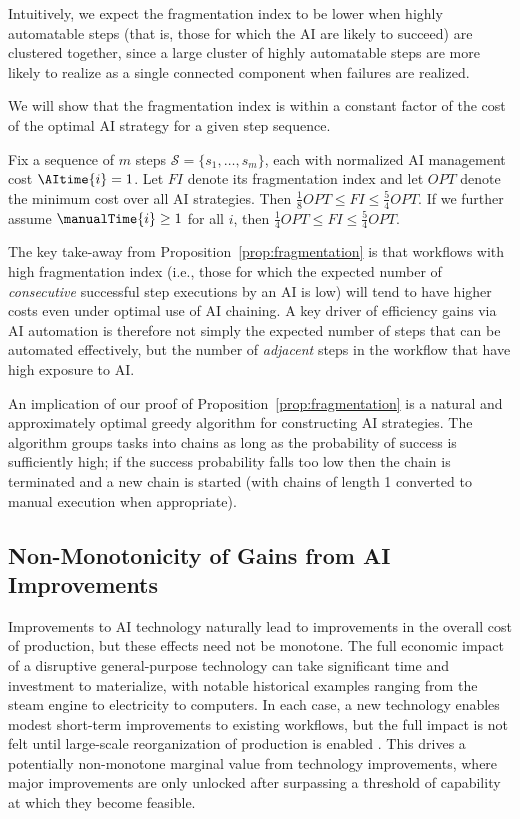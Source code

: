 Intuitively, we expect the fragmentation index to be lower when highly automatable steps (that is, those for which the AI are likely to succeed) are clustered together, since a large cluster of highly automatable steps are more likely to realize as a single connected component when failures are realized.

We will show that the fragmentation index is within a constant factor of the cost of the optimal AI strategy for a given step sequence.

\begin{proposition}
\label{prop:fragmentation}
   Fix a sequence of $m$ steps $\mathcal{S} = \{s_1, \dotsc, s_m\}$, each with normalized AI management cost $\AItime{i} = 1$.
   Let $FI$ denote its fragmentation index and let $OPT$ denote the minimum cost over all AI strategies.
   Then $\tfrac{1}{8}OPT \leq FI \leq \tfrac{5}{4}OPT$.
   If we further assume $\manualTime{i} \geq 1$ for all $i$, then $\tfrac{1}{4}OPT \leq FI \leq \tfrac{5}{4}OPT$.
\end{proposition}

The key take-away from Proposition~\ref{prop:fragmentation} is that workflows with high fragmentation index (i.e., those for which the expected number of \emph{consecutive} successful step executions by an AI is low) will tend to have higher costs even under optimal use of AI chaining.
A key driver of efficiency gains via AI automation is therefore not simply the expected number of steps that can be automated effectively, but the number of \emph{adjacent} steps in the workflow that have high exposure to AI.

An implication of our proof of Proposition~\ref{prop:fragmentation} is a natural and approximately optimal greedy algorithm for constructing AI strategies.
The algorithm groups tasks into chains as long as the probability of success is sufficiently high; if the success probability falls too low then the chain is terminated and a new chain is started (with chains of length 1 converted to manual execution when appropriate).



\subsection{Non-Monotonicity of Gains from AI Improvements}
\label{sec:nonlinear}

Improvements to AI technology naturally lead to improvements in the overall cost of production, but these effects need not be monotone.
The full economic impact of a disruptive general-purpose technology can take significant time and investment to materialize, with notable historical examples ranging from the steam engine to electricity to computers.
In each case, a new technology enables modest short-term improvements to existing workflows, but the full impact is not felt until large-scale reorganization of production is enabled \citep{brynjolfsson2021productivity}.
This drives a potentially non-monotone marginal value from technology improvements, where major improvements are only unlocked after surpassing a threshold of capability at which they become feasible.

